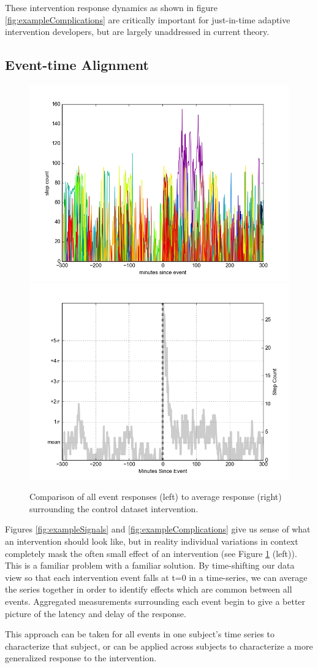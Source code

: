 \documentclass[review,journal]{vgtc}         %
\begin{document}
These intervention response dynamics as shown in figure \ref{fig:exampleComplications} are critically important for just-in-time adaptive intervention developers, but are largely unaddressed in current theory.

\subsection{Event-time Alignment}

\begin{figure}
\centering
\includegraphics[width=0.45\columnwidth]{./img/perfect_intervention_individual_events.png}
\includegraphics[width=0.45\columnwidth]{./img/perfect_intervention.png}
\caption{Comparison of all event responses (left) to average response (right) surrounding the control dataset intervention.}
\label{fig:interventionAverage}
\end{figure}

Figures \ref{fig:exampleSignals} and \ref{fig:exampleComplications} give us sense of what an intervention should look like, but in reality individual variations in context completely mask the often small effect of an intervention (see Figure \ref{fig:interventionAverage} (left)).
This is a familiar problem with a familiar solution.
By time-shifting our data view so that each intervention event falls at t=0 in a time-series, we can average the series together in order to identify effects which are common between all events.
Aggregated measurements surrounding each event begin to give a better picture of the latency and delay of the response.

This approach can be taken for all events in one subject's time series to characterize that subject, or can be applied across subjects to characterize a more generalized response to the intervention.
\end{document}
